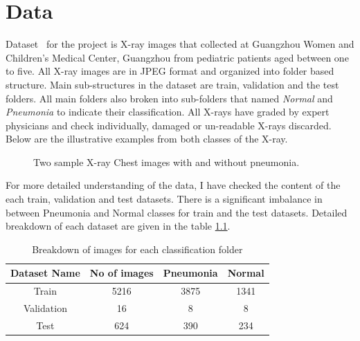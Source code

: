 \chapter{Data} \label{chap:data}
Dataset~\cite{dataset} for the project is X-ray images that collected at Guangzhou Women and Children’s Medical Center, Guangzhou from pediatric patients aged between one to five.
All X-ray images are in JPEG format and organized into folder based structure.
Main sub-structures in the dataset are train, validation and the test folders.
All main folders also broken into sub-folders that named \emph{Normal} and \emph{Pneumonia} to indicate their classification.
All X-rays have graded by expert physicians and check individually, damaged or un-readable X-rays discarded.
Below are the illustrative examples from both classes of the X-ray.

\begin{figure}[H]%
    \centering
    \qquad
    \caption{Two sample X-ray Chest images with and without pneumonia.}%
    \label{fig:sample}%
\end{figure}

For more detailed understanding of the data, I have checked the content of the each train, validation and test datasets. 
There is a significant imbalance in between Pneumonia and Normal classes for train and the test datasets.
Detailed breakdown of each dataset are given in the table \ref{table:dataset}.


\begin{table}[H]
    \centering
    \begin{tabular}{||c c c c||} 
    \hline
    Dataset Name & No of images & Pneumonia & Normal \\ [0.5ex] 
    \hline\hline
    Train & 5216 & 3875 & 1341 \\ 
    \hline
    Validation & 16 & 8 & 8 \\
    \hline
    Test & 624 & 390 & 234 \\ [1ex] 
    \hline
    \end{tabular}
    \caption{Breakdown of images for each classification folder}
    \label{table:dataset}
\end{table}



